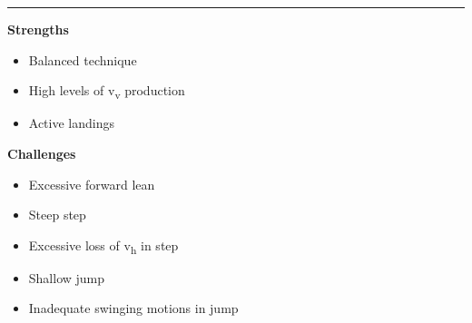 \documentclass[]{scrreprt}
\providecommand{\tightlist}{%
  \setlength{\itemsep}{0pt}\setlength{\parskip}{0pt}}
\begin{document}
\begin{center}\rule{0.5\linewidth}{0.5pt}\end{center}

\textbf{Strengths}

\begin{itemize}
\tightlist
\item
  Balanced technique
\item
  High levels of v\textsubscript{v} production
\item
  Active landings
\end{itemize}

\textbf{Challenges}

\begin{itemize}
\tightlist
\item
  Excessive forward lean
\item
  Steep step
\item
  Excessive loss of v\textsubscript{h} in step
\item
  Shallow jump
\item
  Inadequate swinging motions in jump
\end{itemize}

\clearpage

\printbibliography
\end{document}
